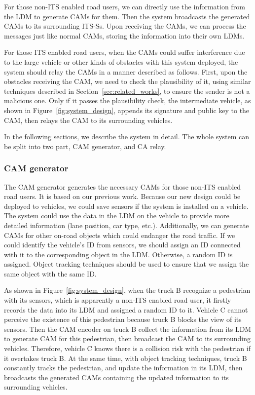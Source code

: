 For those non-ITS enabled road users,
we can directly use the information from the LDM to generate CAMs for them.
Then the system broadcasts the generated CAMs to its surrounding ITS-Ss.
Upon receiving the CAMs, we can process the messages just like normal CAMs,
storing the information into their own LDMs.

For those ITS enabled road users,
when the CAMs could suffer interference due to the large vehicle or other kinds of obstacles with this system deployed,
the system should relay the CAMs in a manner described as follows.
First, upon the obstacles receiving the CAM, we need to check the plausibility of it,
using similar techniques described in Section~\ref{sec:related_works}, to ensure the sender is not a malicious one.
Only if it passes the plausibility check, the intermediate vehicle, as shown in Figure~\ref{fig:system_design},
appends its signature and public key to the CAM, then relays the CAM to its surrounding vehicles.

In the following sections, we describe the system in detail.
The whole system can be split into two part, CAM generator, and CA relay.

\subsubsection{CAM generator}

The CAM generator generates the necessary CAMs for those non-ITS enabled road users.
It is based on our previous work. Because our new design could be deployed to vehicles,
we could save sensors if the system is installed on a vehicle.
The system could use the data in the LDM on the vehicle to provide more detailed information (lane position, car type, etc.).
Additionally, we can generate CAMs for other on-road objects which could endanger the road traffic.
If we could identify the vehicle's ID from sensors,
we should assign an ID connected with it to the corresponding object in the LDM.
Otherwise, a random ID is assigned.
Object tracking techniques should be used to ensure that we assign the same object with the same ID.

As shown in Figure~\ref{fig:system_design}, when the truck B recognize a pedestrian with its sensors,
which is apparently a non-ITS enabled road user,
it firstly records the data into its LDM and assigned a random ID to it.
Vehicle C cannot perceive the existence of this pedestrian because truck B blocks the view of its sensors.
Then the CAM encoder on truck B collect the information from its LDM to generate CAM for this pedestrian,
then broadcast the CAM to its surrounding vehicles.
Therefore, vehicle C knows there is a collision risk with the pedestrian if it overtakes truck B.
At the same time, with object tracking techniques,
truck B constantly tracks the pedestrian, and update the information in its LDM,
then broadcasts the generated CAMs containing the updated information to its surrounding vehicles.

